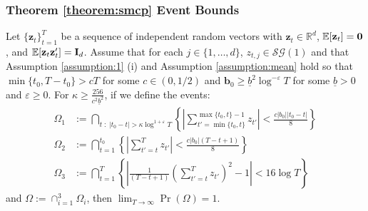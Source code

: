 \subsubsection{Theorem \ref{theorem:smcp} Event Bounds}

\begin{lemma}\label{lemma:thm1-event-bound}
Let $\{\mathbf{z}_t\}_{t=1}^T$ be a sequence of independent random vectors with $\mathbf{z}_t \in \mathbb{R}^d$, $\mathbb{E}[\mathbf{z}_t] = \mathbf{0}$, and $\mathbb{E}[\mathbf{z}_t\mathbf{z}'_t] = \mathbf{I}_d$. Assume that for each $j \in \{1,\ldots, d\}$, $z_{t,j} \in \mathcal{SG}(1)$ and that Assumption \ref{assumption:1} (i) and Assumption \ref{assumption:mean} hold so that $\min\{t_0, T-t_0\} > cT$ for some $c \in (0,1/2)$ and $\mathbf{b}_0 \geq \underline{b}^2 \log^{-\varepsilon} T$ for some $\underline{b} > 0$ and $\varepsilon \geq 0$. For $\kappa \geq \frac{256}{c^2 \underline{b}^2}$, if we define the events:
\begin{align*}
    \Omega_1 &:= \bigcap_{t \;:\; |t_0 - t| > \kappa \log^{1+\varepsilon}T} \left\{\left|\sum_{t'=\min\{t_0,t\}}^{\max\{t_0,t\}-1} z_{t'}\right| < \frac{c|b_0||t_0-t|}{8}\right\} \\
    \Omega_2 &:= \bigcap_{t=1}^{t_0} \left\{\left|\sum_{t'=t}^T z_{t'}\right| < \frac{c|b_0|(T-t+1)}{8}\right\} \\
    \Omega_3 &:= \bigcap_{t=1}^T \left\{\left|\frac{1}{(T-t+1)}\left(\sum_{t'=t}^{T} z_{t'}\right)^2 - 1\right| < 16 \log T \right\}
\end{align*}
and $\Omega := \cap_{i=1}^3 \Omega_i$, then $\lim_{T\to\infty} \Pr(\Omega) = 1$.
\end{lemma}

